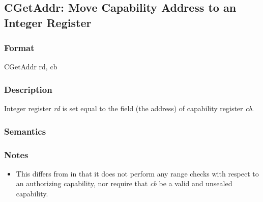 \clearpage
{}
{}
\subsection*{CGetAddr: Move Capability Address to an Integer Register}

\subsubsection*{Format}

CGetAddr rd, cb

\begin{center}
\end{center}

\subsubsection*{Description}

Integer register \textit{rd} is set equal to the \ccursor{} field (the address) of
capability register \textit{cb}.


\subsubsection*{Semantics}


\subsubsection*{Notes}

\begin{itemize}
\item
This differs from  in that it does not perform any range
checks with respect to an authorizing capability, nor require that \emph{cb}
be a valid and unsealed capability.
\end{itemize}
